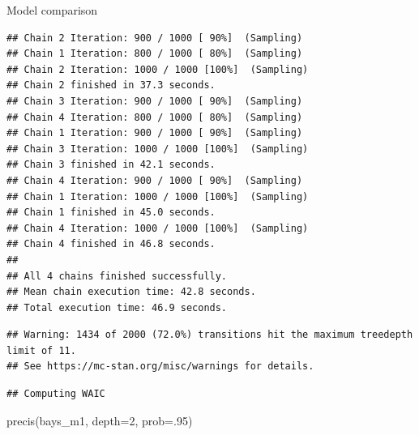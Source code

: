 \documentclass[
  ignorenonframetext,
]{beamer}
\newenvironment{Shaded}{\begin{snugshade}}{\end{snugshade}}
\newcommand{\AttributeTok}[1]{\textcolor[rgb]{0.77,0.63,0.00}{#1}}
\newcommand{\DecValTok}[1]{\textcolor[rgb]{0.00,0.00,0.81}{#1}}
\newcommand{\FunctionTok}[1]{\textcolor[rgb]{0.00,0.00,0.00}{#1}}
\newcommand{\NormalTok}[1]{#1}
\begin{document}
\begin{frame}[fragile]{Model comparison}
\begin{verbatim}
## Chain 2 Iteration: 900 / 1000 [ 90%]  (Sampling) 
## Chain 1 Iteration: 800 / 1000 [ 80%]  (Sampling) 
## Chain 2 Iteration: 1000 / 1000 [100%]  (Sampling) 
## Chain 2 finished in 37.3 seconds.
## Chain 3 Iteration: 900 / 1000 [ 90%]  (Sampling) 
## Chain 4 Iteration: 800 / 1000 [ 80%]  (Sampling) 
## Chain 1 Iteration: 900 / 1000 [ 90%]  (Sampling) 
## Chain 3 Iteration: 1000 / 1000 [100%]  (Sampling) 
## Chain 3 finished in 42.1 seconds.
## Chain 4 Iteration: 900 / 1000 [ 90%]  (Sampling) 
## Chain 1 Iteration: 1000 / 1000 [100%]  (Sampling) 
## Chain 1 finished in 45.0 seconds.
## Chain 4 Iteration: 1000 / 1000 [100%]  (Sampling) 
## Chain 4 finished in 46.8 seconds.
## 
## All 4 chains finished successfully.
## Mean chain execution time: 42.8 seconds.
## Total execution time: 46.9 seconds.
\end{verbatim}

\begin{verbatim}
## Warning: 1434 of 2000 (72.0%) transitions hit the maximum treedepth limit of 11.
## See https://mc-stan.org/misc/warnings for details.
\end{verbatim}

\begin{verbatim}
## Computing WAIC
\end{verbatim}

\begin{Shaded}
\begin{Highlighting}[]
\FunctionTok{precis}\NormalTok{(bays\_m1, }\AttributeTok{depth=}\DecValTok{2}\NormalTok{, }\AttributeTok{prob=}\NormalTok{.}\DecValTok{95}\NormalTok{)}
\end{Highlighting}
\end{Shaded}


\end{frame}
\end{document}
